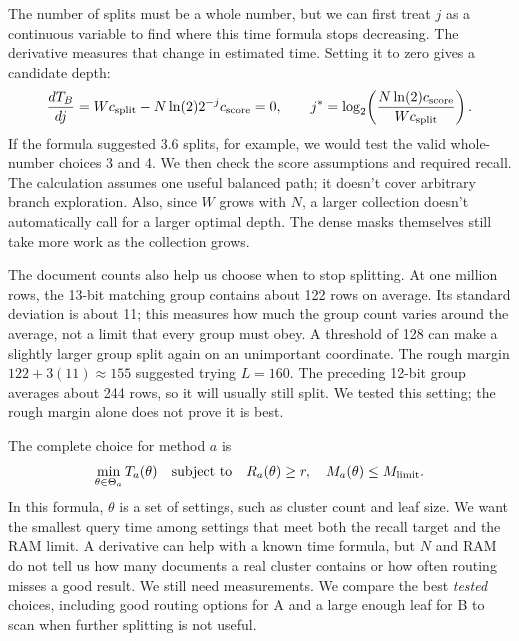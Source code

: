 The number of splits must be a whole number, but we can first treat $j$ as a continuous
variable to find where this time formula stops decreasing. The derivative measures that
change in estimated time. Setting it to zero gives a candidate depth:
\[
\frac{dT_B}{dj}=Wc_{\rm split}-N\ln(2)2^{-j}c_{\rm score}=0,
\qquad
j^*=\log_2\!\left(\frac{N\ln(2)c_{\rm score}}{Wc_{\rm split}}\right).
\]
If the formula suggested 3.6 splits, for example, we would test the valid whole-number choices
3 and 4. We then check the score assumptions and required recall. The
calculation assumes one useful balanced path;
it doesn't cover arbitrary branch exploration. Also, since $W$ grows with $N$, a larger
collection doesn't automatically call for a larger optimal depth. The dense masks themselves
still take more work as the collection grows.

The document counts also help us choose when to stop splitting. At one million rows, the
13-bit matching group contains about 122 rows on average. Its standard deviation is about 11;
this measures how much the group count varies around the average, not a limit that every
group must obey. A threshold of 128 can make a slightly larger group split again on an
unimportant coordinate. The rough margin $122+3(11)\approx155$ suggested trying $L=160$.
The preceding 12-bit group averages about 244 rows, so it will usually still split. We tested
this setting; the rough margin alone does not prove it is best.

The complete choice for method $a$ is
\begin{equation}
\min_{\theta\in\Theta_a}T_a(\theta)
\quad\text{subject to}\quad R_a(\theta)\ge r,\quad M_a(\theta)\le M_{\rm limit}.
\label{eq:choice}
\end{equation}
In this formula, $\theta$ is a set of settings, such as cluster count and leaf size.
We want the smallest query time among settings that meet both the recall target and the RAM
limit. A derivative can help with a known time formula, but $N$ and RAM do not tell us how
many documents a real cluster contains or how often routing misses a good result. We still
need measurements. We compare the best \emph{tested} choices, including good routing options
for A and a large enough leaf for B to scan when further splitting is not useful.
